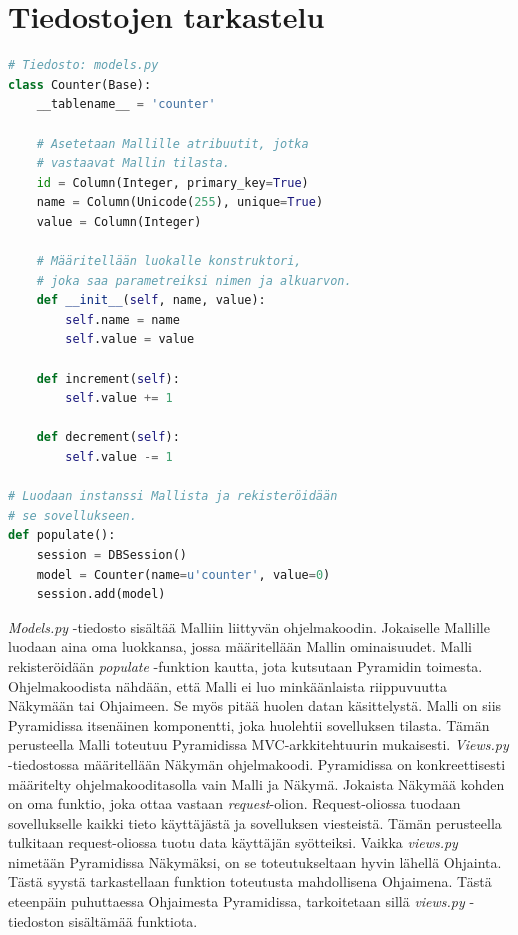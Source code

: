 \documentclass[utf8]{gradu3}
\begin{document}
\section{Tiedostojen tarkastelu}
\lstset{numbers=left}
\begin{lstlisting}[language=Python]
# Tiedosto: models.py
class Counter(Base):
    __tablename__ = 'counter'

    # Asetetaan Mallille atribuutit, jotka
    # vastaavat Mallin tilasta.
    id = Column(Integer, primary_key=True)
    name = Column(Unicode(255), unique=True)
    value = Column(Integer)

    # Määritellään luokalle konstruktori,
    # joka saa parametreiksi nimen ja alkuarvon.
    def __init__(self, name, value):
        self.name = name
        self.value = value

    def increment(self):
        self.value += 1

    def decrement(self):
        self.value -= 1

# Luodaan instanssi Mallista ja rekisteröidään 
# se sovellukseen.
def populate():
    session = DBSession()
    model = Counter(name=u'counter', value=0)
    session.add(model)
\end{lstlisting}
\emph{Models.py} -tiedosto sisältää Malliin liittyvän ohjelmakoodin. Jokaiselle Mallille luodaan aina oma luokkansa, jossa määritellään Mallin ominaisuudet. Malli rekisteröidään \emph{populate} -funktion kautta, jota kutsutaan Pyramidin toimesta.
Ohjelmakoodista nähdään, että Malli ei luo minkäänlaista riippuvuutta Näkymään tai Ohjaimeen. Se myös pitää huolen datan käsittelystä.  Malli on siis Pyramidissa itsenäinen komponentti, joka huolehtii sovelluksen tilasta. Tämän perusteella Malli toteutuu Pyramidissa MVC-arkkitehtuurin mukaisesti.
\emph{Views.py} -tiedostossa määritellään Näkymän ohjelmakoodi. Pyramidissa on konkreettisesti määritelty ohjelmakooditasolla vain Malli ja Näkymä.
Jokaista Näkymää kohden on oma funktio, joka ottaa vastaan \emph{request}-olion. Request-oliossa tuodaan sovellukselle kaikki tieto käyttäjästä ja sovelluksen viesteistä. Tämän perusteella tulkitaan request-oliossa tuotu data käyttäjän syötteiksi.
Vaikka \emph{views.py} nimetään Pyramidissa Näkymäksi, on se toteutukseltaan hyvin lähellä Ohjainta. Tästä syystä tarkastellaan funktion toteutusta mahdollisena Ohjaimena. Tästä eteenpäin puhuttaessa Ohjaimesta Pyramidissa, tarkoitetaan sillä \emph{views.py} -tiedoston sisältämää funktiota.
\end{document}
